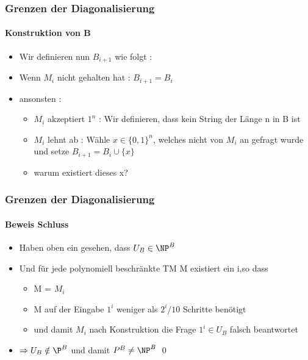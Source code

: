 \begin{frame}
	\frametitle{Grenzen der Diagonalisierung}
	\framesubtitle{Konstruktion von B}
	\begin{itemize}[<+->]
	  \item Wir definieren nun $B_{i+1}$ wie folgt :
	  \item Wenn $M_i$ nicht gehalten hat : $B_{i+1} = B_i$
	  \item ansonsten : \begin{itemize}
	    \item $M_i$ akzeptiert $1^n$ : Wir definieren, dass kein String der Länge n
	    in B ist
	    \item $M_i$ lehnt ab : Wähle $x \in {\lbrace 0,1 \rbrace}^n$, welches nicht
	    von $M_i$ an gefragt wurde und setze $B_{i+1} = B_i \cup \lbrace x \rbrace$
	    \item warum existiert dieses x?
	    \end{itemize}
	\end{itemize}
\end{frame}

\begin{frame}
	\frametitle{Grenzen der Diagonalisierung}
	\framesubtitle{Beweis Schluss}
	
	\begin{itemize}[<+->]
	  \item Haben oben ein gesehen, dass $U_B \in {\NP}^B$
	  \item Und f\"ur jede polynomiell beschränkte TM M existiert ein i,so dass 
	  	\begin{itemize}
	  	  \item M = $M_i$
	  	  \item M auf der Eingabe $1^i$ weniger als $2^i / 10 $ Schritte benötigt
	  	  \item und damit $M_i$ nach Konstruktion die Frage $1^i \in U_B$ falsch
	  	  beantwortet
	  	 \end{itemize}
	  	\item $\Rightarrow U_B \notin {\P}^B$ und damit ${P}^B \neq {\NP}^B$ \qed
	\end{itemize}
\end{frame}